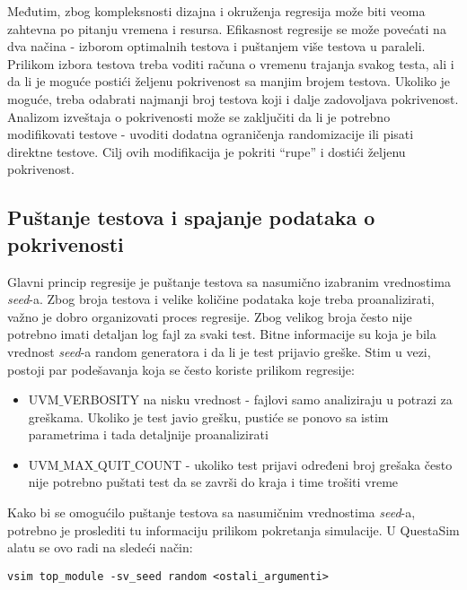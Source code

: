 Međutim, zbog kompleksnosti dizajna i okruženja regresija može biti veoma
zahtevna po pitanju vremena i resursa. Efikasnost regresije se može povećati na
dva načina - izborom optimalnih testova i puštanjem više testova u paraleli.
Prilikom izbora testova treba voditi računa o vremenu trajanja svakog testa, ali
i da li je moguće postići željenu pokrivenost sa manjim brojem testova. Ukoliko
je moguće, treba odabrati najmanji broj testova koji i dalje zadovoljava
pokrivenost.\\

Analizom izveštaja o pokrivenosti može se zaključiti da li je potrebno
modifikovati testove - uvoditi dodatna ograničenja randomizacije ili pisati
direktne testove. Cilj ovih modifikacija je pokriti ``rupe'' i dostići željenu
pokrivenost.


\subsection{Puštanje testova i spajanje podataka o pokrivenosti}

Glavni princip regresije je puštanje testova sa nasumično izabranim vrednostima
\emph{seed}-a. Zbog broja testova i velike količine podataka koje treba
proanalizirati, važno je dobro organizovati proces regresije. Zbog velikog broja
često nije potrebno imati detaljan log fajl za svaki test. Bitne informacije su
koja je bila vrednost \emph{seed}-a random generatora i da li je test prijavio
greške. Stim u vezi, postoji par podešavanja koja se često koriste prilikom
regresije:

\begin{itemize}
\item UVM\(\_\)VERBOSITY na nisku vrednost - fajlovi samo analiziraju u potrazi
  za greškama. Ukoliko je test javio grešku, pustiće se ponovo sa istim
  parametrima i tada detaljnije proanalizirati
\item UVM\(\_\)MAX\(\_\)QUIT\(\_\)COUNT - ukoliko test prijavi određeni broj
  grešaka često nije potrebno puštati test da se završi do kraja i time trošiti
  vreme
\end{itemize}

Kako bi se omogućilo puštanje testova sa nasumičnim vrednostima \emph{seed}-a,
potrebno je proslediti tu informaciju prilikom pokretanja simulacije. U
QuestaSim alatu se ovo radi na sledeći način:

\begin{lstlisting}
vsim top_module -sv_seed random <ostali_argumenti>
\end{lstlisting}

